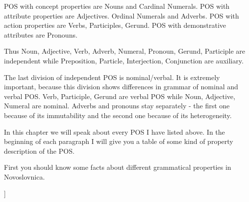 POS with concept properties are Nouns and Cardinal Numerals. POS with attribute properties are Adjectives. Ordinal Numerals and Adverbs. POS with action properties are Verbs, Participles, Gerund. POS with demonstrative attributes are Pronouns.

Thus Noun, Adjective, Verb, Adverb, Numeral, Pronoun, Gerund, Participle are independent while Preposition, Particle, Interjection, Conjunction are auxiliary.

The last division of independent POS is nominal/verbal. It is extremely important, because this division shows differences in grammar of nominal and verbal POS. Verb, Participle, Gerund are verbal POS while Noun, Adjective, Numeral are nominal. Adverbs and pronouns stay separately - the first one because of its immutability and the second one because of its heterogeneity. 

In this chapter we will speak about every POS I have listed above. In the beginning of each paragraph I will give you a table of some kind of property description of the POS.

First you should know some facts about different grammatical properties in Novoslovnica.








]

